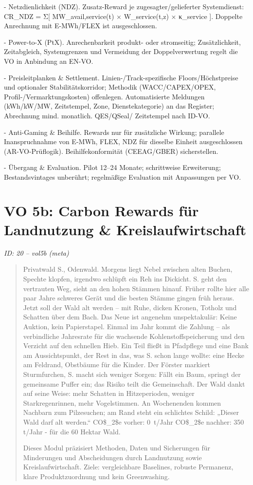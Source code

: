 \documentclass[12pt,a4paper]{scrartcl}
\begin{document}
- Netzdienlichkeit (NDZ). Zusatz-Reward je zugesagter/gelieferter Systemdienst: CR\_NDZ = Σ[ MW\_avail,service(t) × W\_service(t,z) × κ\_service ]. Doppelte Anrechnung mit E-MWh/FLEX ist ausgeschlossen.

- Power-to-X (PtX). Anrechenbarkeit produkt- oder stromseitig; Zusätzlichkeit, Zeitabgleich, Systemgrenzen und Vermeidung der Doppelverwertung regelt die VO in Anbindung an EN-VO.

- Preisleitplanken \& Settlement. Linien-/Track-spezifische Floors/Höchstpreise und optionaler Stabilitätskorridor; Methodik (WACC/CAPEX/OPEX, Profil-/Vermarktungskosten) offenlegen. Automatisierte Meldungen (kWh/kW/MW, Zeitstempel, Zone, Dienstekategorie) an das Register; Abrechnung mind. monatlich. QES/QSeal/ Zeitstempel nach ID-VO.

- Anti-Gaming \& Beihilfe. Rewards nur für zusätzliche Wirkung; parallele Inanspruchnahme von E-MWh, FLEX, NDZ für dieselbe Einheit ausgeschlossen (AR-VO-Prüflogik). Beihilfekonformität (CEEAG/GBER) sicherstellen.

- Übergang \& Evaluation. Pilot 12--24 Monate; schrittweise Erweiterung; Bestandsvintages unberührt; regelmäßige Evaluation mit Anpassungen per VO.


\section[VO 5b: Carbon Rewards für Landnutzung \& Kreislaufwirtschaft]{VO 5b: Carbon Rewards für Landnutzung \& Kreislaufwirtschaft}
\noindent\textit{ID: 20 -- vol5b (meta)}

\begin{quote}
Privatwald S., Odenwald. Morgens liegt Nebel zwischen alten Buchen, Spechte klopfen, irgendwo schlüpft ein Reh ins Dickicht. S. geht den vertrauten Weg, sieht an den hohen Stämmen hinauf. Früher rollte hier alle paar Jahre schweres Gerät und die besten Stämme gingen früh heraus. Jetzt soll der Wald alt werden -- mit Ruhe, dicken Kronen, Totholz und Schatten über dem Bach. Das Neue ist angenehm unspektakulär: Keine Auktion, kein Papierstapel. Einmal im Jahr kommt die Zahlung -- als verbindliche Jahresrate für die wachsende Kohlenstoffspeicherung und den Verzicht auf den schnellen Hieb. Ein Teil fließt in Pfadpflege und eine Bank am Aussichtspunkt, der Rest in das, was S. schon lange wollte: eine Hecke am Feldrand, Obstbäume für die Kinder. Der Förster markiert Sturmfurchen, S. macht sich weniger Sorgen: Fällt ein Baum, springt der gemeinsame Puffer ein; das Risiko teilt die Gemeinschaft. Der Wald dankt auf seine Weise: mehr Schatten in Hitzeperioden, weniger Starkregenrinnen, mehr Vogelstimmen. An Wochenenden kommen Nachbarn zum Pilzesuchen; am Rand steht ein schlichtes Schild: „Dieser Wald darf alt werden.“ CO\$\_2\$e vorher: 0 t/Jahr CO\$\_2\$e nachher: 350 t/Jahr - für die 60 Hektar Wald.

  Dieses Modul präzisiert Methoden, Daten und Sicherungen für Minderungen und Abscheidungen durch Landnutzung sowie Kreislaufwirtschaft. Ziele: vergleichbare Baselines, robuste Permanenz, klare Produktzuordnung und kein Greenwashing.
\end{quote}
\end{document}
